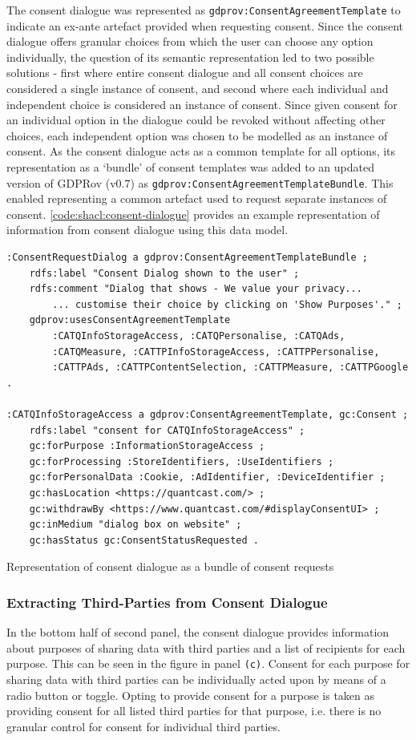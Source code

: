 The consent dialogue was represented as \texttt{gdprov:ConsentAgreementTemplate} to indicate an ex-ante artefact provided when requesting consent.
Since the consent dialogue offers granular choices from which the user can choose any option individually, the question of its semantic representation led to two possible solutions - first where entire consent dialogue and all consent choices are considered a single instance of consent, and second where each individual and independent choice is considered an instance of consent.
Since given consent for an individual option in the dialogue could be revoked without affecting other choices, each independent option was chosen to be modelled as an instance of consent.
As the consent dialogue acts as a common template for all options, its representation as a `bundle' of consent templates was added to an updated version of GDPRov (v0.7) as \texttt{gdprov:ConsentAgreementTemplateBundle}. This enabled representing a common artefact used to request separate instances of consent.
\autoref{code:shacl:consent-dialogue} provides an example representation of information from consent dialogue using this data model.
\begin{listing}[htbp]
\begin{verbatim}
:ConsentRequestDialog a gdprov:ConsentAgreementTemplateBundle ;
    rdfs:label "Consent Dialog shown to the user" ;
    rdfs:comment "Dialog that shows - We value your privacy...
        ... customise their choice by clicking on 'Show Purposes'." ;
    gdprov:usesConsentAgreementTemplate 
        :CATQInfoStorageAccess, :CATQPersonalise, :CATQAds, 
        :CATQMeasure, :CATTPInfoStorageAccess, :CATTPPersonalise, 
        :CATTPAds, :CATTPContentSelection, :CATTPMeasure, :CATTPGoogle .

:CATQInfoStorageAccess a gdprov:ConsentAgreementTemplate, gc:Consent ;
    rdfs:label "consent for CATQInfoStorageAccess" ;
    gc:forPurpose :InformationStorageAccess ;
    gc:forProcessing :StoreIdentifiers, :UseIdentifiers ;
    gc:forPersonalData :Cookie, :AdIdentifier, :DeviceIdentifier ;
    gc:hasLocation <https://quantcast.com/> ;
    gc:withdrawBy <https://www.quantcast.com/#displayConsentUI> ;
    gc:inMedium "dialog box on website" ;
    gc:hasStatus gc:ConsentStatusRequested .
\end{verbatim}
\caption{Representation of consent dialogue as a bundle of consent requests}
\label{code:shacl:consent-dialogue}
\end{listing}

\subsubsection{Extracting Third-Parties from Consent Dialogue}
In the bottom half of second panel, the consent dialogue provides information about purposes of sharing data with third parties and a list of recipients for each purpose. This can be seen in the figure in panel \texttt{(c)}.
Consent for each purpose for sharing data with third parties can be individually acted upon by means of a radio button or toggle. Opting to provide consent for a purpose is taken as providing consent for all listed third parties for that purpose, i.e. there is no granular control for consent for individual third parties. 

